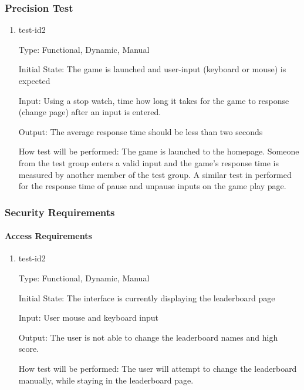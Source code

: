\documentclass[12pt, titlepage]{article}
\begin{document}
	\subsubsection{Precision Test}
	\begin{enumerate}
		\item{test-id2\\}
		
		Type: Functional, Dynamic, Manual
		
		Initial State: The game is launched and user-input (keyboard or mouse) is expected
		
		Input: Using a stop watch, time how long it takes for the game to response (change page) after an input is entered.
		
		Output: The average response time should be less than two seconds
		
		How test will be performed: The game is launched to the homepage. Someone from the test group enters a valid input and the game's response time is measured by another member of the test group. A similar test in performed for the response time of pause and unpause inputs on the game play page.
		
	\end{enumerate}
	
	\subsubsection{Security Requirements}
	
	\paragraph{Access Requirements}
	\begin{enumerate}
		\item{test-id2\\}
		
		Type: Functional, Dynamic, Manual
		
		Initial State: The interface is currently displaying the leaderboard page
		
		Input: User mouse and keyboard input
		
		Output: The user is not able to change the leaderboard names and high score.
		
		How test will be performed: The user will attempt to change the leaderboard manually, while staying in the leaderboard page.
		
	\end{enumerate}
	
\end{document}
